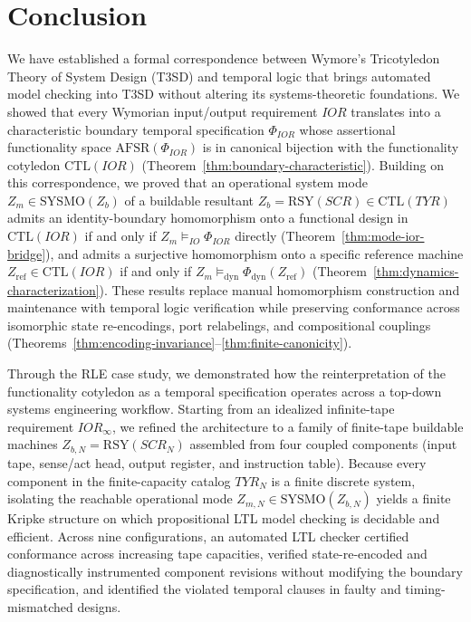 \section{Conclusion}
\label{sec:conclusions}

We have established a formal correspondence between Wymore's Tricotyledon Theory of System Design (T3SD) and temporal logic that brings automated model checking into T3SD without altering its systems-theoretic foundations. We showed that every Wymorian input/output requirement $IOR$ translates into a characteristic boundary temporal specification $\Phi_{IOR}$ whose assertional functionality space $\mathrm{AFSR}(\Phi_{IOR})$ is in canonical bijection with the functionality cotyledon $\mathrm{CTL}(IOR)$ (Theorem~\ref{thm:boundary-characteristic}). Building on this correspondence, we proved that an operational system mode $Z_m\in\mathrm{SYSMO}(Z_b)$ of a buildable resultant $Z_b=\mathrm{RSY}(SCR)\in\mathrm{CTL}(TYR)$ admits an identity-boundary homomorphism onto a functional design in $\mathrm{CTL}(IOR)$ if and only if $Z_m\models_{IO}\Phi_{IOR}$ directly (Theorem~\ref{thm:mode-ior-bridge}), and admits a surjective homomorphism onto a specific reference machine $Z_{\mathrm{ref}}\in\mathrm{CTL}(IOR)$ if and only if $Z_m\models_{\mathrm{dyn}}\Phi_{\mathrm{dyn}}(Z_{\mathrm{ref}})$ (Theorem~\ref{thm:dynamics-characterization}). These results replace manual homomorphism construction and maintenance with temporal logic verification while preserving conformance across isomorphic state re-encodings, port relabelings, and compositional couplings (Theorems~\ref{thm:encoding-invariance}--\ref{thm:finite-canonicity}).

Through the RLE case study, we demonstrated how the reinterpretation of the functionality cotyledon as a temporal specification operates across a top-down systems engineering workflow. Starting from an idealized infinite-tape requirement $IOR_\infty$, we refined the architecture to a family of finite-tape buildable machines $Z_{b,N}=\mathrm{RSY}(SCR_N)$ assembled from four coupled components (input tape, sense/act head, output register, and instruction table). Because every component in the finite-capacity catalog $TYR_N$ is a finite discrete system, isolating the reachable operational mode $Z_{m,N}\in\mathrm{SYSMO}(Z_{b,N})$ yields a finite Kripke structure on which propositional LTL model checking is decidable and efficient. Across nine configurations, an automated LTL checker certified conformance across increasing tape capacities, verified state-re-encoded and diagnostically instrumented component revisions without modifying the boundary specification, and identified the violated temporal clauses in faulty and timing-mismatched designs.

